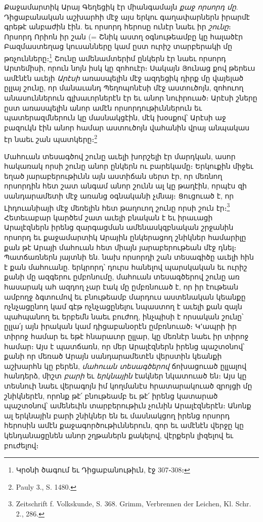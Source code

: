 \documentclass{article}
\begin{document}
{Քաջամարտիկ Արայ Գեղեցիկ էր միանգամայն \emph{քաջ որսորդ մը}. Դիցաբանական աշխարհի մէջ այս երկու գաղափարներն իրարմէ գրեթէ անբաժին էին. եւ որսորդ հերոսը ունէր նաեւ իր \emph{շունը}։ Որսորդ Որիոն իր շան (= Շնիկ աստղ օգնութեամբը կը հալածէր Բազմաստեղաց կուսանները կամ ըստ ուրիշ տարբերակի մը թռչունները։\footnote{Կրօնի ծագում եւ Դիցաբանութիւն, էջ 307֊308։} Շունը ամենամտերիմ ընկերն էր նաեւ որսորդ Արտեմիսի, որուն նոյն իսկ կը զոհուէր։ Սակայն Յունաց քով թերեւս ամէնէն աւեյի \emph{Արէսի} առասպելին մէջ ազդեցիկ դիրք մը վայելած ըլլայ շունը, որ մանաւանդ Պեղոպոնէսի մէջ աստուծոյն, զոհուող անասուններուն գլխաւորներէն էր եւ անոր նուիրուած։ Արէսի շները ըստ առասպելին անոր ամէն որսորդութիւններուն եւ պատերազմներուն կը մասնակցէին, մէկ խօսքով՝ Արէսի աջ բազուկն էին անոր համար աստուծոյն վահանին վրայ անպակաս էր նաեւ շան պատկերը։\footnote{Pauly 3., S. 1480.}

Մահուան տեսագծով շունը աւելի խորշելի էր մարդկան, ասոր հակառակ որսի շունը անոր ընկերն ու բարեկամը։ Երկուքին միջեւ եղած յարաբերութիւնն այն աստիճան սերտ էր, որ մեռնող որսորդին հետ շատ անգամ անոր շունն ալ կը թաղէին, որպէս զի սանդարամետի մէջ առանց օգնականի չմնայ։ Ցուցուած է, որ Լիդուանիայի մէջ մեռելին հետ թաղուող շունը որսի շուն էր։\footnote{Zeitschrift f. Volkskunde, S. 368. Grimm, Verbrennen der Leichen, Kl. Schr. 2., 286.} Հետեւաբար կարծեմ շատ աւելի բնական է եւ իրաւացի Արալէզներն իրենց զարգացման ամենասկզբնական շրջանին որսորդ եւ քաջամարտիկ Արային ընկերացող շնիկներ համարիլը քան թէ Արայի մահուան հետ միայն յարաբերութեան մէջ դնել։ Պատճառներն յայտնի են. նախ որսորդի շան տեսագիծը աւելի հին է քան մահուանը. երկրորդ՝ դուրս հանելով պարսկական եւ ուրիշ քանի մը ազգերու ըմբոնումը, մահուան տեսագծերով շունը առ հասարակ ահ ազդող չար էակ մը ըմբռնուած է, որ իր էութեան ամբողջ ձգտումով եւ բնութեամբ մարդուս աստենական կեանքը ոչնչացընող կամ գէթ ոչնչացընելու նպաստող է աւելի քան զայն պահպանող եւ երբեմն նաեւ բուժող, ինչպիսի է որսական շունը՝ ըլլա՛յ այն իրական կամ դիցաբանօրէն ըմբռնուած։ Կ՚ապրի իր տիրոջ համար եւ եթէ հնարաւոր ըլլար, կը մեռնէր նաեւ իր տիրոջ համար։ Այս է պատճառն, որ մեր Արալէզներն իրենց պաշտօնով՝ քանի որ մեռած Արայն սանդարամետէն վերստին կեանքի աշխարհն կը բերեն, \emph{մահուան տեսագծերով} ճոխացուած ըլլալով հանդերձ, միշտ \emph{բարի} եւ \emph{երկնային} էակներ նկատուած են։ Այս կը տեսնուի նաեւ վերագոյն իմ կողմանէս հրատարակուած զրոյցի մը շնիկներէն, որոնք թէ՛ բնութեամբ եւ թէ՛ իրենց կատարած պաշտօնով՝ ամենեւին տարբերութիւն չունին Արալէզներէն։ Անոնք ալ երկնային բարի շնիկներ են եւ մասնակցող իրենց որսորդ հերոսին ամէն քաջագործութիւններուն, զոր եւ ամէնէն վերջը կը կենդանացընեն անոր շղթաներն քակելով, վէրքերն լիզելով եւ բուժելով։

}
\end{document}
